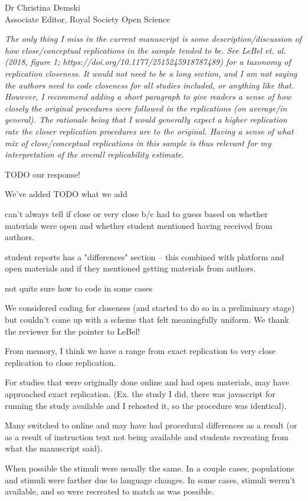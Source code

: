 \documentclass{stanfordletter}
\newcommand{\theysaid}[1]{\begin{leftbar} \noindent 
		\textsl{ #1}\end{leftbar}}
\begin{document}
\begin{letter}{Dr Christina Demski \\ Associate Editor, Royal Society Open Science}
          \theysaid{The only thing I miss in the current manuscript is some description/discussion of how close/conceptual replications in the sample tended to be. See LeBel et. al. (2018, figure 1; https://doi.org/10.1177/2515245918787489) for a taxonomy of replication closeness. It would not need to be a long section, and I am not saying the authors need to code closeness for all studies included, or anything like that. However, I recommend adding a short paragraph to give readers a sense of how closely the original procedures were followed in the replications (on average/in general). The rationale being that I would generally expect a higher replication rate the closer replication procedures are to the original. Having a sense of what mix of close/conceptual replications in this sample is thus relevant for my interpretation of the overall replicability estimate.
          }
          
          TODO our response!
          
          We've added TODO what we add
          
          can't always tell if close or very close b/c had to guess based on whether materials were open and whether student mentioned having received from authors. 
          
		student reports has a "differences" section -- this combined with platform and open materials and if they mentioned getting materials from authors. 
		
		not quite sure how to code in some cases
          
          We considered coding for closeness (and started to do so in a preliminary stage) but couldn't come up with a scheme that felt meaningfully uniform. We thank the reviewer for the pointer to LeBel!
          
          From memory, I think we have a range from exact replication to very close replication to close replication. 
          
          For studies that were originally done online and had open materials, may have approached exact replication. (Ex. the study I did, there was javascript for running the study available and I rehosted it, so the procedure was identical). 
          
          Many switched to online and may have had procedural differences as a result (or as a result of instruction text not being available and students recreating from what the manuscript said). 
          
          When possible the stimuli were usually the same. In a couple cases, populations and stimuli were farther due to language changes. In some cases, stimuli weren't available, and so were recreated to match as was possible. 
          

\end{letter}
\end{document}
